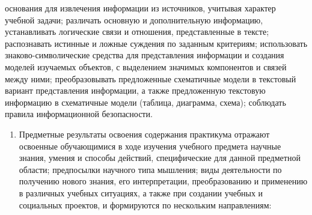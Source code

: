 \documentclass[
  11pt,
  russian,
]{book}
\providecommand{\tightlist}{%
  \setlength{\itemsep}{0pt}\setlength{\parskip}{0pt}}
\begin{document}
\begin{itemize}
  основания для извлечения информации из источников, учитывая характер
  учебной задачи; различать основную и дополнительную информацию,
  устанавливать логические связи и отношения, представленные в тексте;
  распознавать истинные и ложные суждения по заданным критериям;
  использовать знаково-символические средства для представления
  информации и создания моделей изучаемых объектов, с выделением
  значимых компонентов и связей между ними; преобразовывать предложенные
  схематичные модели в текстовый вариант представления информации, а
  также предложенную текстовую информацию в схематичные модели (таблица,
  диаграмма, схема); соблюдать правила информационной безопасности.
\end{itemize}

\begin{enumerate}
\def\labelenumi{\arabic{enumi}.}
\setcounter{enumi}{2}
\tightlist
\item
  Предметные результаты освоения содержания практикума отражают
  освоенные обучающимися в ходе изучения учебного предмета научные
  знания, умения и способы действий, специфические для данной предметной
  области; предпосылки научного типа мышления; виды деятельности по
  получению нового знания, его интерпретации, преобразованию и
  применению в различных учебных ситуациях, а также при создании учебных
  и социальных проектов, и формируются по нескольким направлениям:
\end{enumerate}
\end{document}
